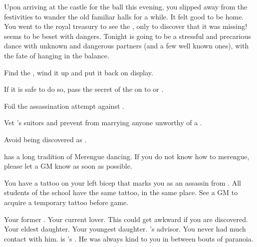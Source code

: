 \documentclass[char]{NeptuneBall}
\begin{document}
Upon arriving at the castle for the ball this evening, you slipped away from the festivities to wander the old familiar halls for a while. It felt good to be home. You went to the royal treasury to see the \iMusicBox{\MYname}, only to discover that it was missing! \pAtlantis{} seems to be beset with dangers. Tonight is going to be a stressful and precarious dance with unknown and dangerous partners (and a few well known ones), with the fate of \pAtlantis{} hanging in the balance.


\begin{itemz}[Goals]
  \item Find the \iMusicBox{}, wind it up and put it back on display.
  \item If it is safe to do so, pass the secret of the \iMusicBox{} on to \cAriel{} or \cPrincess{}.
  \item Foil the assassination attempt against \cKing{}.
  \item Vet \cPrincess{}'s suitors and prevent \cPrincess{\them} from marrying anyone unworthy of a \cPrincess{\prince}.
  \item Avoid being discovered as \cQueen{\King} \cQueen{}.
\end{itemz}


\begin{itemz}[Notes]
  \item \pAtlantis{} has a long tradition of Merengue dancing. If you do not know how to merengue, please let a GM know as soon as possible.
  \item You have a tattoo on your left bicep that marks you as an assassin from \pAssassin{}. All students of the school have the same tattoo, in the same place. See a GM to acquire a temporary tattoo before game.
\end{itemz}

\begin{contacts}
  \contact{\cKing{}} Your former \cKing{\spouse}.
  \contact{\cGeneral{}} Your current lover. This could get awkward if you are discovered.
  \contact{\cAriel{}} Your eldest daughter.
  \contact{\cPrincess{}} Your youngest daughter.
  \contact{\cManta{}} \cKing{}'s advisor. You never had much contact with him.
  \contact{\cPlant{}} \cPlant{} is \cKing{}'s \cPlant{\sibling}. He was always kind to you in between bouts of paranoia.
\end{contacts}
\end{document}
